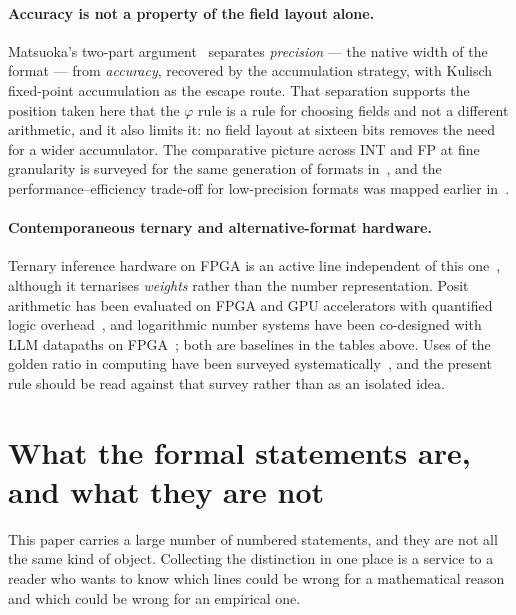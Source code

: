 \documentclass[11pt]{article}
\theoremstyle{definition}
\begin{document}
\paragraph{Accuracy is not a property of the field layout alone.} Matsuoka's
two-part argument~\cite{matsuoka2026fp8a,matsuoka2026fp8b} separates
\emph{precision} --- the native width of the format --- from \emph{accuracy},
recovered by the accumulation strategy, with Kulisch fixed-point accumulation as
the escape route. That separation supports the position taken here that the
$\varphi$ rule is a rule for choosing fields and not a different arithmetic, and
it also limits it: no field layout at sixteen bits removes the need for a wider
accumulator. The comparative picture across INT and FP at fine granularity is
surveyed for the same generation of formats in~\cite{int_vs_fp2025}, and the
performance--efficiency trade-off for low-precision formats was mapped
earlier in~\cite{mlformats}.

\paragraph{Contemporaneous ternary and alternative-format hardware.} Ternary
inference hardware on FPGA is an active line independent of this
one~\cite{tereffic2025,tenet2025}, although it ternarises \emph{weights} rather
than the number representation. Posit arithmetic has been evaluated on FPGA and
GPU accelerators with quantified logic overhead~\cite{posit_accel2024}, and
logarithmic number systems have been co-designed with LLM datapaths on
FPGA~\cite{pnnl_lns2025}; both are baselines in the tables above. Uses of the
golden ratio in computing have been surveyed
systematically~\cite{akhtaruzzaman2024phi}, and the present rule should be read
against that survey rather than as an isolated idea.

\section{What the formal statements are, and what they are
not}\label{sec:statusofstatements}

This paper carries a large number of numbered statements, and they are not all the
same kind of object. Collecting the distinction in one place is a service to a
reader who wants to know which lines could be wrong for a mathematical reason and
which could be wrong for an empirical one.
\end{document}
